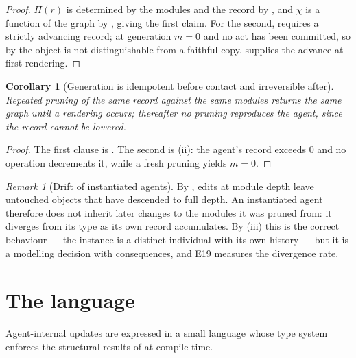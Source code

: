 \documentclass[11pt,a4paper]{article}
\theoremstyle{clstyle}
\newtheorem{corollary}[theorem]{Corollary}
\theoremstyle{definition}
\theoremstyle{remark}
\newtheorem{remark}[theorem]{Remark}
\newcommand{\Char}{\chi}
\newcommand{\rec}{m}
\begin{document}
\begin{proof}
$\Pi(r)$ is determined by the modules and the record by , and
$\Char$ is a function of the graph by , giving the first
claim. For the second,  requires a strictly advancing
record; at generation $\rec=0$ and no act has been committed, so by
 the object is not distinguishable from a faithful copy.
 supplies the advance at first rendering.
\end{proof}

\begin{corollary}[Generation is idempotent before contact and irreversible
after]
\label{cor:idempotent}
Repeated pruning of the same record against the same modules returns the same
graph until a rendering occurs; thereafter no pruning reproduces the agent,
since the record cannot be lowered.
\end{corollary}

\begin{proof}
The first clause is . The second is
(ii): the agent's record exceeds $0$ and no operation
decrements it, while a fresh pruning yields $\rec=0$.
\end{proof}

\begin{remark}[Drift of instantiated agents]
\label{rem:drift}
By , edits at module depth leave untouched objects that
have descended to full depth. An instantiated agent therefore does not
inherit later changes to the modules it was pruned from: it diverges from its
type as its own record accumulates. By (iii) this is the
correct behaviour --- the instance is a distinct individual with its own
history --- but it is a modelling decision with consequences, and E19
measures the divergence rate.
\end{remark}

\section{The language}
\label{sec:language}

Agent-internal updates are expressed in a small language whose type system
enforces the structural results of 
at compile time.
\end{document}
